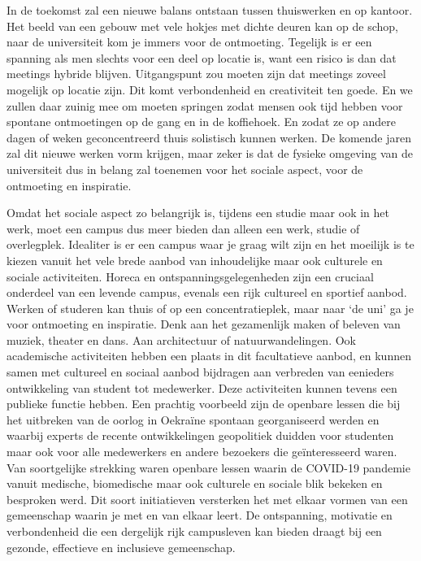 \documentclass[smallauthor, chapterhaspagenum, nochapterinheader, pagenuminheader,  bigchapnum,medium2, tocpages, garamond, titleinheader]{jote-book}
\begin{document}
	In de toekomst zal een nieuwe balans ontstaan tussen thuiswerken en op kantoor. Het beeld van een gebouw met vele hokjes met dichte deuren kan op de schop, naar de universiteit kom je immers voor de ontmoeting. Tegelijk is er een spanning als men slechts voor een deel op locatie is, want een risico is dan dat meetings hybride blijven. Uitgangspunt zou moeten zijn dat meetings zoveel mogelijk op locatie zijn. Dit komt verbondenheid en creativiteit ten goede. En we zullen daar zuinig mee om moeten springen zodat mensen ook tijd hebben voor spontane ontmoetingen op de gang en in de koffiehoek. En zodat ze op andere dagen of weken geconcentreerd thuis solistisch kunnen werken. De komende jaren zal dit nieuwe werken vorm krijgen, maar zeker is dat de fysieke omgeving van de universiteit dus in belang zal toenemen voor het sociale aspect, voor de ontmoeting en inspiratie.

	\enlargethispage{\baselineskip}\checkandfixthelayout

	Omdat het sociale aspect zo belangrijk is, tijdens een studie maar ook in het werk, moet een campus dus meer bieden dan alleen een werk, studie of overlegplek. Idealiter is er een campus waar je graag wilt zijn en het moeilijk is te kiezen vanuit het vele brede aanbod van inhoudelijke maar ook culturele en sociale activiteiten. Horeca en ontspanningsgelegenheden zijn een cruciaal onderdeel van een levende campus, evenals een rijk cultureel en sportief aanbod. Werken of studeren kan thuis of op een concentratieplek, maar naar ‘de uni' ga je voor ontmoeting en inspiratie. Denk aan het gezamenlijk maken of beleven van muziek, theater en dans. Aan architectuur of natuurwandelingen. Ook academische activiteiten hebben een plaats in dit facultatieve aanbod, en kunnen samen met cultureel en sociaal aanbod bijdragen aan verbreden van eenieders ontwikkeling van student tot medewerker. Deze activiteiten kunnen tevens een publieke functie hebben. Een prachtig voorbeeld zijn de openbare lessen die bij het uitbreken van de oorlog in Oekraïne spontaan georganiseerd werden en waarbij experts de recente ontwikkelingen geopolitiek duidden voor studenten maar ook voor alle medewerkers en andere bezoekers die geïnteresseerd waren. Van soortgelijke strekking waren openbare lessen waarin de COVID-19 pandemie vanuit medische, biomedische maar ook culturele en sociale blik bekeken en besproken werd. Dit soort initiatieven versterken het met elkaar vormen van een gemeenschap waarin je met en van elkaar leert. De ontspanning, motivatie en verbondenheid die een dergelijk rijk campusleven kan bieden draagt bij een gezonde, effectieve en inclusieve gemeenschap.
\end{document}

